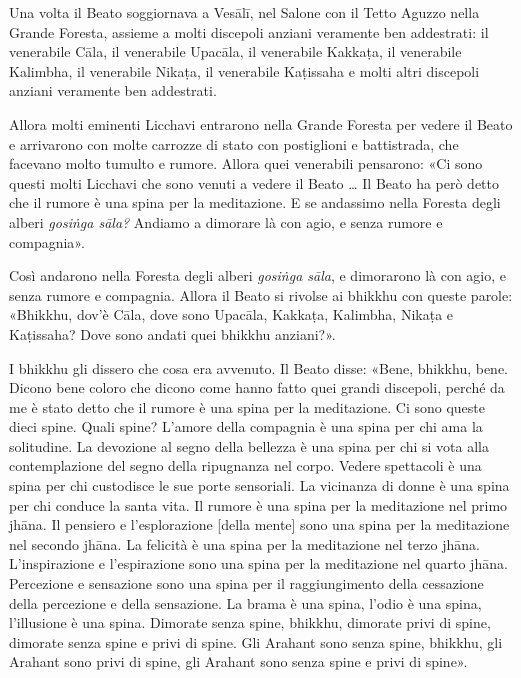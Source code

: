 

Una volta il Beato soggiornava a Vesālī, nel Salone con il Tetto Aguzzo
nella Grande Foresta, assieme a molti discepoli anziani veramente ben
addestrati: il venerabile Cāla, il venerabile Upacāla, il venerabile
Kakkaṭa, il venerabile Kalimbha, il venerabile Nikaṭa, il venerabile
Kaṭissaha e molti altri discepoli anziani veramente ben addestrati.


Allora molti eminenti Licchavi entrarono nella Grande Foresta per vedere
il Beato e arrivarono con molte carrozze di stato con postiglioni e
battistrada, che facevano molto tumulto e rumore. Allora quei venerabili
pensarono: «Ci sono questi molti Licchavi che sono venuti a vedere il
Beato … Il Beato ha però detto che il rumore è una spina per la
meditazione. E se andassimo nella Foresta degli alberi \emph{gosiṅga sāla?}
Andiamo a dimorare là con agio, e senza rumore e compagnia».


Così andarono nella Foresta degli alberi \emph{gosiṅga sāla}, e dimorarono là
con agio, e senza rumore e compagnia. Allora il Beato si rivolse ai
bhikkhu con queste parole: «Bhikkhu, dov’è Cāla, dove sono Upacāla,
Kakkaṭa, Kalimbha, Nikaṭa e Kaṭissaha? Dove sono andati quei bhikkhu
anziani?».


I bhikkhu gli dissero che cosa era avvenuto. Il Beato disse: «Bene,
bhikkhu, bene. Dicono bene coloro che dicono come hanno fatto quei
grandi discepoli, perché da me è stato detto che il rumore è una spina
per la meditazione. Ci sono queste dieci spine. Quali spine? L’amore
della compagnia è una spina per chi ama la solitudine. La devozione al
segno della bellezza è una spina per chi si vota alla contemplazione del
segno della ripugnanza nel corpo. Vedere spettacoli è una spina per chi
custodisce le sue porte sensoriali. La vicinanza di donne è una spina
per chi conduce la santa vita. Il rumore è una spina per la meditazione
nel primo jhāna. Il pensiero e l’esplorazione [della mente] sono una
spina per la meditazione nel secondo jhāna. La felicità è una spina per
la meditazione nel terzo jhāna. L’inspirazione e l’espirazione sono una
spina per la meditazione nel quarto jhāna. Percezione e sensazione sono
una spina per il raggiungimento della cessazione della percezione e
della sensazione. La brama è una spina, l’odio è una spina, l’illusione
è una spina. Dimorate senza spine, bhikkhu, dimorate privi di spine,
dimorate senza spine e privi di spine. Gli Arahant sono senza spine,
bhikkhu, gli Arahant sono privi di spine, gli Arahant sono senza spine e
privi di spine».


